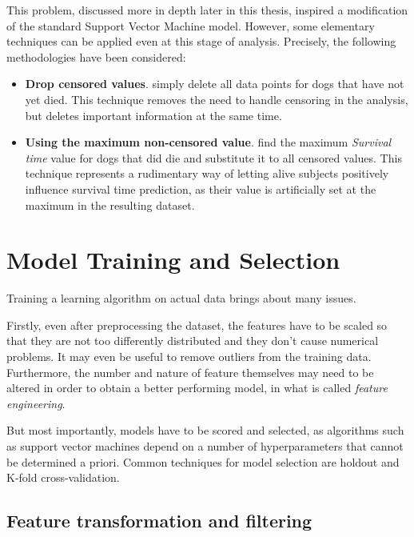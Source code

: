 \documentclass[12pt]{report}
\begin{document}
This problem, discussed more in depth later in this thesis, inspired a modification of the standard Support Vector Machine model. However, some elementary techniques can be applied even at this stage of analysis. Precisely, the following methodologies have been considered:
\begin{itemize}
\item \textbf{Drop censored values}. simply delete all data points for dogs that have not yet died. This technique removes the need to handle censoring in the analysis, but deletes important information at the same time.
\item \textbf{Using the maximum non-censored value}. find the maximum \textit{Survival time} value for dogs that did die and substitute it to all censored values. This technique represents a rudimentary way of letting alive subjects positively influence survival time prediction, as their value is artificially set at the maximum in the resulting dataset.
\end{itemize}

\chapter{Model Training and Selection}
\label{chmodsel}
Training a learning algorithm on actual data brings about many issues.

Firstly, even after preprocessing the dataset, the features have to be scaled so that they are not too differently distributed and they don't cause numerical problems. It may even be useful to remove outliers from the training data. Furthermore, the number and nature of feature themselves may need to be altered in order to obtain a better performing model, in what is called \textit{feature engineering}.

But most importantly, models have to be scored and selected, as algorithms such as support vector machines depend on a number of hyperparameters that cannot be determined a priori. Common techniques for model selection are holdout and K-fold cross-validation.

\section{Feature transformation and filtering}
\end{document}
